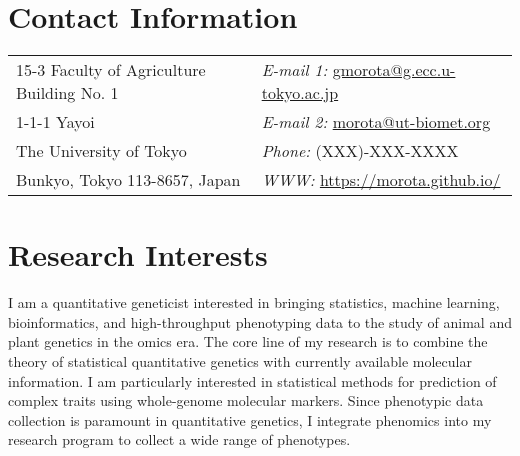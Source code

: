 \documentclass[margin,line,10pt]{res}
\begin{document}

\begin{resume}
\section{\sc Contact Information}
\vspace{.05in}
\begin{tabular}{@{}p{3in}p{4in}}
15-3 Faculty of Agriculture Building No. 1 & \hspace{1cm}  {\it E-mail 1:}  \href{mailto:gmorota@g.ecc.u-tokyo.ac.jp}{gmorota@g.ecc.u-tokyo.ac.jp} \\   
1-1-1 Yayoi  & \hspace{1cm} {\it E-mail 2:}  \href{mailto:morota@ut-biomet.org}{morota@ut-biomet.org}  \\  
The University of Tokyo   & \hspace{1cm} {\it Phone:} (XXX)-XXX-XXXX  \\
Bunkyo, Tokyo 113-8657, Japan & \hspace{1cm} {\it WWW:} \textcolor{blue}{\href{https://morota.github.io/}{https://morota.github.io/}  } \\
\end{tabular}


\vspace{0.4cm}
\section{\sc Research Interests}
I am a quantitative geneticist interested in bringing statistics, machine learning,  bioinformatics, and high-throughput phenotyping data to the study of animal and plant genetics in the omics era. The core line of my research is to combine the theory of statistical quantitative genetics with currently available molecular information. 
I am particularly interested in statistical methods for prediction of complex traits using whole-genome molecular markers. Since phenotypic data collection is paramount in quantitative genetics, I integrate phenomics into my research program to collect a wide range of phenotypes. 


\vspace{0.4cm}

\end{resume}
\end{document}
